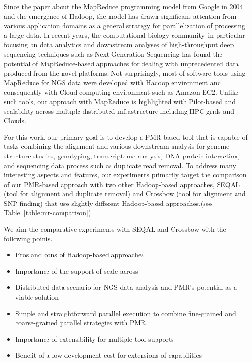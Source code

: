 \documentclass{sig-alternate}
\begin{document}

Since the paper about the MapReduce programming model from Google in 2004\cite{mapreduce-2004-dean} and the emergence of Hadoop, the model has drawn significant attention from various application domains as a general strategy for parallelization of processing a large data.  In recent years, the computational biology community, in particular focusing on data analytics and downstream analyses of high-throughput deep sequencing techniques such as Next-Generation Sequencing has found the potential of MapReduce-based approaches for dealing with unprecedented data produced from the novel platforms\cite{schatz-nature-biotech-2010}.  Not surprisingly, most of software tools using MapReduce for NGS data were developed with Hadoop environment and consequently with Cloud computing environment such as Amazon EC2.  Unlike such tools, our approach with MapReduce is highlighted with Pilot-based and scalability across multiple distributed infrastructure including HPC grids and Clouds.  

For this work, our primary goal is to develop a PMR-based tool that is capable of tasks combining the alignment and various downstream analysis for genome structure studies, genotyping, transcriptome analysis, DNA-protein interaction, and sequencing data process such as duplicate read removal.  To address many interesting aspects and features, our experiments primarily target the comparison of our PMR-based approach with two other Hadoop-based approaches, SEQAL (tool for alignment and duplicate removal) and Crossbow (tool for alignment and SNP finding) that use slightly different Hadoop-based approaches.(see Table~\ref{table:mr-comparison}).  

We aim the comparative experiments with SEQAL and Crossbow with the following points.
\begin{itemize}
\item Pros and cons of Hadoop-based approaches
\item Importance of the support of scale-across 
\item Distributed data scenario for NGS data analysis and PMR's potential as a viable solution
\item Simple and straightforward parallel execution to combine fine-grained and coarse-grained parallel strategies with PMR 
\item Importance of extensibility for multiple tool supports
\item Benefit of a low development cost for extensions of capabilities 
\end{itemize}
\end{document}
